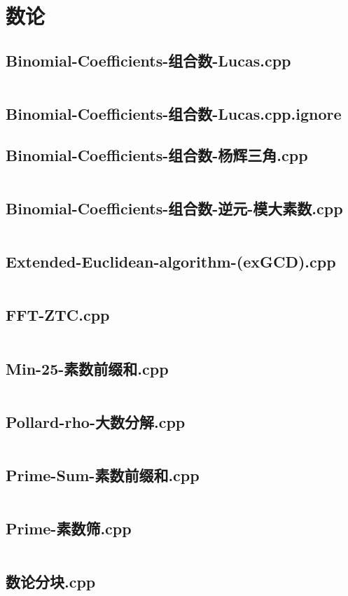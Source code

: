 \documentclass[a4paper,landscape,twocolumn]{article} %
\begin{document}
\section{数论}
\subsection{Binomial-Coefficients-组合数-Lucas.cpp}
\inputminted{c++}{./codes/041}
\subsection{Binomial-Coefficients-组合数-Lucas.cpp.ignore}
\subsection{Binomial-Coefficients-组合数-杨辉三角.cpp}
\inputminted{c++}{./codes/043}
\subsection{Binomial-Coefficients-组合数-逆元-模大素数.cpp}
\inputminted{c++}{./codes/044}
\subsection{Extended-Euclidean-algorithm-(exGCD).cpp}
\inputminted{c++}{./codes/045}
\subsection{FFT-ZTC.cpp}
\inputminted{c++}{./codes/046}
\subsection{Min-25-素数前缀和.cpp}
\inputminted{c++}{./codes/047}
\subsection{Pollard-rho-大数分解.cpp}
\inputminted{c++}{./codes/048}
\subsection{Prime-Sum-素数前缀和.cpp}
\inputminted{c++}{./codes/049}
\subsection{Prime-素数筛.cpp}
\inputminted{c++}{./codes/050}
\subsection{数论分块.cpp}
\inputminted{c++}{./codes/051}
\end{document}
